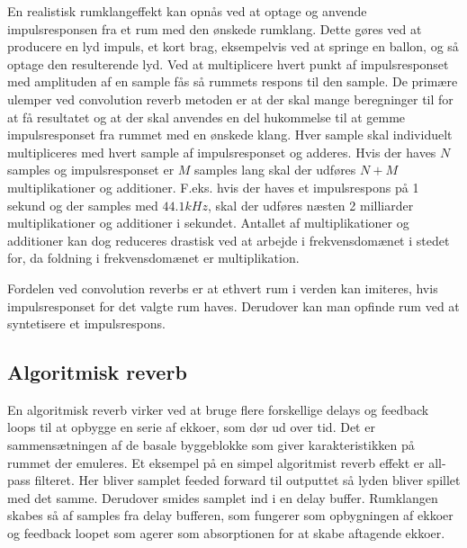 En realistisk rumklangeffekt kan opnås ved at optage og anvende impulsresponsen fra et rum med den ønskede rumklang.
Dette gøres ved at producere en lyd impuls, et kort brag, eksempelvis ved at springe en ballon, og så optage den resulterende lyd. 
Ved at multiplicere hvert punkt af impulsresponset med amplituden af en sample fås så rummets respons til den sample.
De primære ulemper ved convolution reverb metoden er at der skal mange beregninger til for at få resultatet og at der skal anvendes en del hukommelse til at gemme impulsresponset fra rummet med en ønskede klang.
Hver sample skal individuelt multipliceres med hvert sample af impulsresponset og adderes.
Hvis der haves $N$ samples og impulsresponset er $M$ samples lang skal der udføres $N+M$ multiplikationer og additioner.
F.eks. hvis der haves et impulsrespons på 1 sekund og der samples med $44.1\si{kHz}$, skal der udføres næsten 2 milliarder multiplikationer og additioner i sekundet.
Antallet af multiplikationer og additioner kan dog reduceres drastisk ved at arbejde i frekvensdomænet i stedet for, da foldning i frekvensdomænet er multiplikation.

Fordelen ved convolution reverbs er at ethvert rum i verden kan imiteres, hvis impulsresponset for det valgte rum haves.\newline
Derudover kan man opfinde rum ved at syntetisere et impulsrespons.

\subsection{Algoritmisk reverb}
En algoritmisk reverb virker ved at bruge flere forskellige delays og feedback loops til at opbygge en serie af ekkoer, som dør ud over tid.
Det er sammensætningen af de basale byggeblokke som giver karakteristikken på rummet der emuleres.\newline
Et eksempel på en simpel algoritmist reverb effekt er all-pass filteret.
Her bliver samplet feeded forward til outputtet så lyden bliver spillet med det samme.
Derudover smides samplet ind i en delay buffer.
Rumklangen skabes så af samples fra delay bufferen, som fungerer som opbygningen af ekkoer og feedback loopet som agerer som absorptionen for at skabe aftagende ekkoer.




